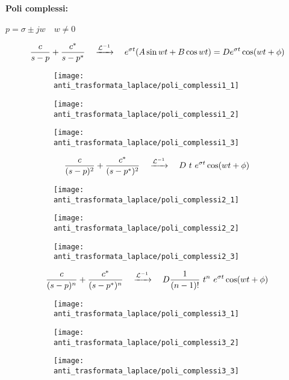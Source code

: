 \documentclass[../main.tex]{subfiles}
\begin{document}
		\paragraph{Poli complessi:} $ p = \sigma \pm jw \quad w \neq 0 $
		\begin{figure}[H]
			\[
				\frac{c}{s-p} + \frac{c^*}{s-p^*}  \quad \xrightarrow{\mathcal{L}^{-1}} \quad  e^{\sigma t} (A \sin wt + B \cos wt) = D e^{\sigma t} \cos (wt + \phi)
			\]
			\centering
			\begin{subfigure}{0.3\textwidth}
				\texttt{[image: anti\_trasformata\_laplace/poli\_complessi1\_1]}
			\end{subfigure}
			\begin{subfigure}{0.3\textwidth}
				\texttt{[image: anti\_trasformata\_laplace/poli\_complessi1\_2]}
			\end{subfigure}
			\begin{subfigure}{0.3\textwidth}
				\texttt{[image: anti\_trasformata\_laplace/poli\_complessi1\_3]}
			\end{subfigure}
		\end{figure}
		\begin{figure}[H]
			\[
				\frac{c}{(s-p)^2} + \frac{c^*}{(s-p^*)^2}  \quad \xrightarrow{\mathcal{L}^{-1}} \quad  D\ t\ e^{\sigma t} \cos (wt + \phi)
			\]
			\centering
			\begin{subfigure}{0.3\textwidth}
				\texttt{[image: anti\_trasformata\_laplace/poli\_complessi2\_1]}
			\end{subfigure}
			\begin{subfigure}{0.3\textwidth}
				\texttt{[image: anti\_trasformata\_laplace/poli\_complessi2\_2]}
			\end{subfigure}
			\begin{subfigure}{0.3\textwidth}
				\texttt{[image: anti\_trasformata\_laplace/poli\_complessi2\_3]}
			\end{subfigure}
		\end{figure}
		\begin{figure}[H]
			\[
				\frac{c}{(s-p)^n} + \frac{c^*}{(s-p^*)^n}  \quad \xrightarrow{\mathcal{L}^{-1}} \quad  D \frac{1}{(n-1)!}\ t^n\ e^{\sigma t} \cos (wt + \phi)
			\]
			\centering
			\begin{subfigure}{0.3\textwidth}
				\texttt{[image: anti\_trasformata\_laplace/poli\_complessi3\_1]}
			\end{subfigure}
			\begin{subfigure}{0.3\textwidth}
				\texttt{[image: anti\_trasformata\_laplace/poli\_complessi3\_2]}
			\end{subfigure}
			\begin{subfigure}{0.3\textwidth}
				\texttt{[image: anti\_trasformata\_laplace/poli\_complessi3\_3]}
			\end{subfigure}
		\end{figure}
\end{document}
